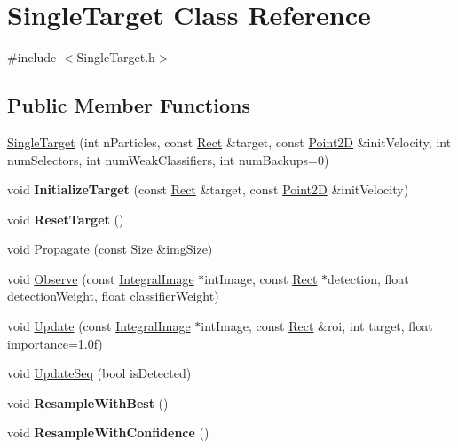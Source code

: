\hypertarget{classSingleTarget}{}\section{Single\+Target Class Reference}
\label{classSingleTarget}


{\ttfamily \#include $<$Single\+Target.\+h$>$}

\subsection*{Public Member Functions}
\begin{DoxyCompactItemize}
\item 
\hyperlink{classSingleTarget_a9abf9f637e1378b1490cb76dbeadc6be}{Single\+Target} (int n\+Particles, const \hyperlink{classRect}{Rect} \&target, const \hyperlink{classPoint2D}{Point2\+D} \&init\+Velocity, int num\+Selectors, int num\+Weak\+Classifiers, int num\+Backups=0)
\item 
\hypertarget{classSingleTarget_afa791ad34c84b8a9d9d2e60398e5db2e}{}void {\bfseries Initialize\+Target} (const \hyperlink{classRect}{Rect} \&target, const \hyperlink{classPoint2D}{Point2\+D} \&init\+Velocity)\label{classSingleTarget_afa791ad34c84b8a9d9d2e60398e5db2e}

\item 
\hypertarget{classSingleTarget_a6e8ac2254143bba06f46ee55c957d4ec}{}void {\bfseries Reset\+Target} ()\label{classSingleTarget_a6e8ac2254143bba06f46ee55c957d4ec}

\item 
void \hyperlink{classSingleTarget_a2036d90f89d1a65966523c559aee3d38}{Propagate} (const \hyperlink{classSize}{Size} \&img\+Size)
\item 
void \hyperlink{classSingleTarget_a7ad134f1c4d53e45bcbc636b9fc6a943}{Observe} (const \hyperlink{classIntegralImage}{Integral\+Image} $\ast$int\+Image, const \hyperlink{classRect}{Rect} $\ast$detection, float detection\+Weight, float classifier\+Weight)
\item 
void \hyperlink{classSingleTarget_a5b2d2b9313f7d3bd8d96af68f840bff4}{Update} (const \hyperlink{classIntegralImage}{Integral\+Image} $\ast$int\+Image, const \hyperlink{classRect}{Rect} \&roi, int target, float importance=1.\+0f)
\item 
void \hyperlink{classSingleTarget_aa620ca1f64fe972c8dc110e0a6012213}{Update\+Seq} (bool is\+Detected)
\item 
\hypertarget{classSingleTarget_a4b77b8dbe78d051ab5f190eef5b9a51a}{}void {\bfseries Resample\+With\+Best} ()\label{classSingleTarget_a4b77b8dbe78d051ab5f190eef5b9a51a}

\item 
\hypertarget{classSingleTarget_a8ba04565921bcbcce7a04c1c76daa4ca}{}void {\bfseries Resample\+With\+Confidence} ()\label{classSingleTarget_a8ba04565921bcbcce7a04c1c76daa4ca}

\end{DoxyCompactItemize}


